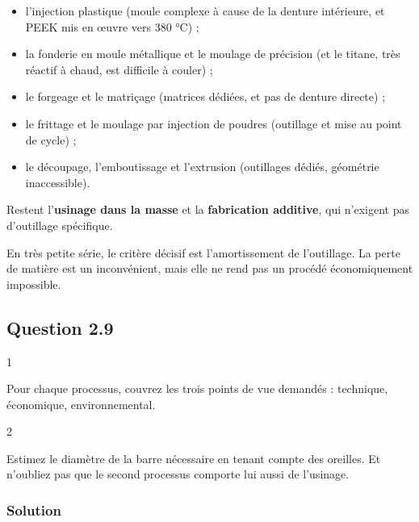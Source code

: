 \documentclass[11pt,a4paper]{article}
\providecommand{\tightlist}{\setlength{\itemsep}{0pt}\setlength{\parskip}{0pt}}
\begin{document}
\begin{itemize}
\tightlist
\item
  l'injection plastique (moule complexe à cause de la denture intérieure, et PEEK mis en œuvre vers 380 °C) ;
\item
  la fonderie en moule métallique et le moulage de précision (et le titane, très réactif à chaud, est difficile à couler) ;
\item
  le forgeage et le matriçage (matrices dédiées, et pas de denture directe) ;
\item
  le frittage et le moulage par injection de poudres (outillage et mise au point de cycle) ;
\item
  le découpage, l'emboutissage et l'extrusion (outillages dédiés, géométrie inaccessible).
\end{itemize}

Restent l'\textbf{usinage dans la masse} et la \textbf{fabrication additive}, qui n'exigent pas d'outillage spécifique.

\begin{methode}

En très petite série, le critère décisif est l'amortissement de l'outillage. La perte de matière est un inconvénient, mais elle ne rend pas un procédé économiquement impossible.

\end{methode}

\hypertarget{question-2.9}{%
\subsection{Question 2.9}\label{question-2.9}}

\begin{indication}{1}

Pour chaque processus, couvrez les trois points de vue demandés : technique, économique, environnemental.

\end{indication}

\begin{indication}{2}

Estimez le diamètre de la barre nécessaire en tenant compte des oreilles. Et n'oubliez pas que le second processus comporte lui aussi de l'usinage.

\end{indication}

\hypertarget{solution-22}{%
\subsubsection{Solution}\label{solution-22}}
\end{document}
